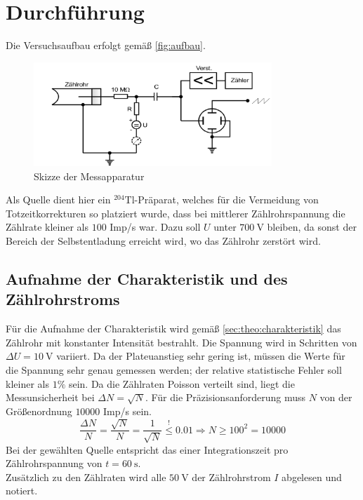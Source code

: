 \section{Durchführung}
\label{sec:Durchführung}

Die Versuchsaufbau erfolgt gemäß \autoref{fig:aufbau}.
\begin{figure}[H]
	\centering
	\includegraphics[width=0.8\textwidth]{content/aufbau.png}
	\caption{Skizze der Messapparatur \cite{sample}}
	\label{fig:aufbau}
\end{figure}

\noindent
Als Quelle dient hier ein $^{204}\text{Tl}$-Präparat, welches für die Vermeidung von Totzeitkorrekturen so platziert 
wurde, dass bei mittlerer Zählrohrspannung die Zählrate kleiner als $100$ Imp/s war. Dazu soll $U$ unter $\SI{700}{\volt}$
bleiben, da sonst der Bereich der Selbstentladung erreicht wird, wo das Zählrohr zerstört wird.

\subsection{Aufnahme der Charakteristik und des Zählrohrstroms}
\label{sec:durch:charakteristik}

Für die Aufnahme der Charakteristik wird gemäß \autoref{sec:theo:charakteristik} das Zählrohr mit konstanter 
Intensität bestrahlt. Die Spannung wird in Schritten von $\Delta U = \SI{10}{\volt}$ variiert. Da der Plateuanstieg
sehr gering ist, müssen die Werte für die Spannung sehr genau gemessen werden; der relative statistische Fehler soll
kleiner als $1\%$ sein. Da die Zählraten Poisson verteilt sind, liegt die Messunsicherheit bei $\Delta N = \sqrt{N}$.
Für die Präzisionsanforderung muss $N$ von der Größenordnung $10000$ Imp/s sein.
\begin{equation}
	\frac{\Delta N}{N} = \frac{\sqrt{N}}{N} = \frac{1}{\sqrt{N}} \overset{!}{\leq} 0.01 
	\Rightarrow N \geq 100^2 = 10000
\end{equation}
\noindent
Bei der gewählten Quelle entspricht das einer Integrationszeit pro Zählrohrspannung von $t = \SI{60}{\second}$.
\\
Zusätzlich zu den Zählraten wird alle $\SI{50}{\volt}$ der Zählrohrstrom $I$ abgelesen und notiert.

